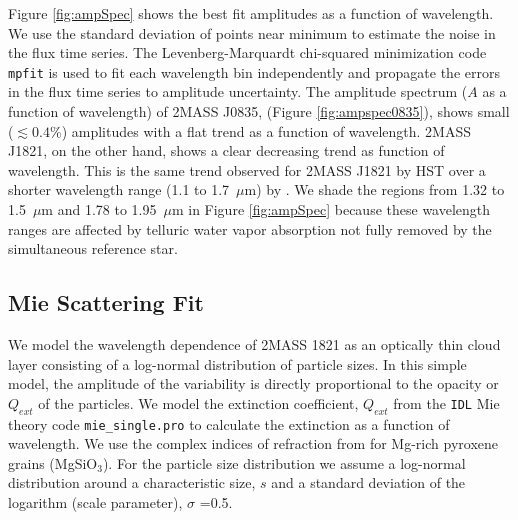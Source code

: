 \documentclass[twocolumn]{aastex6}
\begin{document}
Figure \ref{fig:ampSpec} shows the best fit amplitudes as a function of wavelength.
We use the standard deviation of points near minimum to estimate the noise in the flux time series.
The Levenberg-Marquardt chi-squared minimization code \texttt{mpfit} is used to fit each wavelength bin independently and propagate the errors in the flux time series to amplitude uncertainty.
The amplitude spectrum ($A$ as a function of wavelength) of 2MASS J0835, (Figure \ref{fig:ampspec0835}), shows small ($\lesssim 0.4\%$) amplitudes with a flat trend as a function of wavelength.
2MASS J1821, on the other hand, shows a clear decreasing trend as function of wavelength.
This is the same trend observed for 2MASS J1821 by HST over a shorter wavelength range (1.1 to 1.7~$\mu$m) by \citet{2015ApJ...798L..13Y}.
We shade the regions from 1.32 to 1.5~$\mu$m and 1.78 to 1.95~$\mu$m in Figure \ref{fig:ampSpec} because these wavelength ranges are affected by telluric water vapor absorption not fully removed by the simultaneous reference star.


\subsection{Mie Scattering Fit}

We model the wavelength dependence of 2MASS 1821 as an optically thin cloud layer consisting of a log-normal distribution of particle sizes.
In this simple model, the amplitude of the variability is directly proportional to the opacity or $Q_{ext}$ of the particles.
We model the extinction coefficient, $Q_{ext}$ from the \texttt{IDL} Mie theory code \texttt{mie\_single.pro} \citep{grainger04} to calculate the extinction as a function of wavelength.
We use the complex indices of refraction from \citet{dorschner95pyrox} for Mg-rich pyroxene grains (MgSiO$_3$).
For the particle size distribution we assume a log-normal distribution around a characteristic size, $s$ and a standard deviation of the logarithm (scale parameter), $\sigma$ =0.5.
\end{document}
